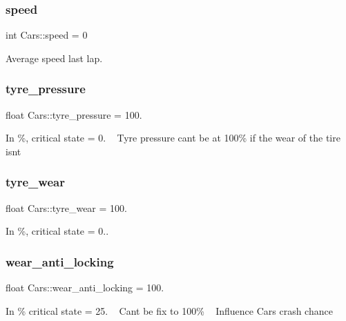 \subsubsection{\texorpdfstring{speed}{speed}}
{\footnotesize\ttfamily int Cars\+::speed = 0}



Average speed last lap. 

\mbox{\label{class_cars_ad7823c613c0375a6a8aa12a9e9905e2e}} 
\subsubsection{\texorpdfstring{tyre\+\_\+pressure}{tyre\_pressure}}
{\footnotesize\ttfamily float Cars\+::tyre\+\_\+pressure = 100.}

In \%, critical state = 0. ~\newline
 Tyre pressure can\textquotesingle{}t be at 100\% if the wear of the tire isn\textquotesingle{}t \mbox{\label{class_cars_a1d8a98aae09009ac284ebe7b2b8bcd7b}} 
\subsubsection{\texorpdfstring{tyre\+\_\+wear}{tyre\_wear}}
{\footnotesize\ttfamily float Cars\+::tyre\+\_\+wear = 100.}



In \%, critical state = 0.. 

\mbox{\label{class_cars_a81735db6f5a4ebb706309dadac1cb972}} 
\subsubsection{\texorpdfstring{wear\+\_\+anti\+\_\+locking}{wear\_anti\_locking}}
{\footnotesize\ttfamily float Cars\+::wear\+\_\+anti\+\_\+locking = 100.}

In \% critical state = 25. ~\newline
 Can\textquotesingle{}t be fix to 100\% ~\newline
 Influence Car\textquotesingle{}s crash chance \mbox{\label{class_cars_a7b98ac5d85cb2e6e931fa34afe3a711a}} 
